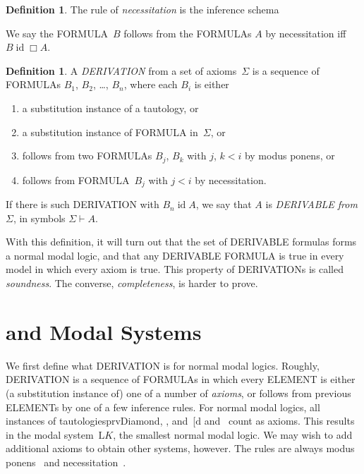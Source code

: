 \documentclass[10pt,a4paper]{article}
\makeatletter
\newcommand*{\olup}[1]{\MakeUppercase{#1}}
\theoremstyle{plain}
\theoremstyle{definition}
\newtheorem{defn}[thm]{Definition}
\theoremstyle{remark}
\newcommand*{\olfileid}[3]{}
\newcommand*{\olsection}[1]{\section*{#1}}
\providecommand{\AxiomC}[1]{}
\providecommand{\UnaryInfC}[1]{}
\providecommand{\RightLabel}[1]{}
\newenvironment{prooftree}{}{}
\providecommand{\Proves}{\mathrel{\vdash}}
\providecommand{\Log}{\ensuremath{\mathrm{L}}}
\providecommand{\iftag}[1]{#1}
\providecommand{\Dual}{\mathrm{d}}
\providecommand{\Ax}{\mathrm{Ax}}
\providecommand{\Nec}{\mathord{\Box}}
\renewcommand{\Dual}{\@ifnextchar[{\Dual@i}{\ifmmode\mathrm{d}\else$\mathrm{d}$\fi}}
\def\Dual@i[#1]{\ifmmode\mathrm{d}[#1]\else$\mathrm{d}[#1]$\fi}
\providecommand{\ident}{\operatorname{id}}
\providecommand{\iftag}{}
\makeatother
\begin{document}
\begin{defn}
The rule of \emph{necessitation} is the inference schema
\begin{prooftree}
\AxiomC{$A$}
\RightLabel{\Nec}
\UnaryInfC{$\Box A$}
\end{prooftree}
We say the \olup{formula}~$B$ follows from the \olup{formula}s $A$ by
necessitation iff $B \ident \Box A$.
\end{defn}

\begin{defn}
A \emph{\olup{derivation}} from a set of axioms~$\Sigma$ is a sequence of
\olup{formula}s $B_1$, $B_2$, \dots, $B_n$, where each $B_i$ is
either
\begin{enumerate}
\item a substitution instance of a tautology, or
\item a substitution instance of \olup{formula} in~$\Sigma$, or
\item follows from two \olup{formula}s $B_j$, $B_k$ with $j$, $k < i$
  by modus ponens, or
\item follows from \olup{formula}~$B_j$ with $j < i$ by necessitation.
\end{enumerate}
If there is such \olup{derivation} with $B_n \ident A$, we say that
$A$ is \emph{\olup{derivable} from $\Sigma$}, in symbols $\Sigma \Proves A$.
\end{defn}

With this definition, it will turn out that the set of \olup{derivable}
formulas forms a normal modal logic, and that any \olup{derivable}
\olup{formula} is true in every model in which every axiom is true. This
property of \olup{derivation}s is called \emph{soundness}. The converse,
\emph{completeness}, is harder to prove.





\olfileid{nml}{prf}{prf}

\olsection{ and Modal Systems}

We first define what \olup{derivation} is for normal modal
logics. Roughly, \olup{derivation} is a sequence of \olup{formula}s in
which every \olup{element} is either (a substitution instance of) one of
a number of \emph{axioms}, or follows from previous \olup{element}s by
one of a few inference rules. For normal modal logics, all instances
of tautologies\iftag{prvDiamond}{, \Ax{K}, and~\Dual{}}{ and~\Ax{K}}
count as axioms. This results in the modal system~$\Log{K}$, the
smallest normal modal logic. We may wish to add additional axioms to
obtain other systems, however. The rules are always modus ponens~\MP{}
and necessitation~\Nec.
\end{document}

